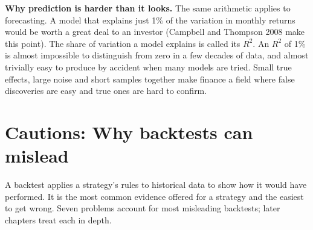
\textbf{Why prediction is harder than it looks.} The same arithmetic applies to forecasting. A model that explains just 1\% of the variation in monthly returns would be worth a great deal to an investor (Campbell and Thompson 2008 make this point). The share of variation a model explains is called its $R^2$. An $R^2$ of 1\% is almost impossible to distinguish from zero in a few decades of data, and almost trivially easy to produce by accident when many models are tried. Small true effects, large noise and short samples together make finance a field where false discoveries are easy and true ones are hard to confirm.

\section{Cautions: Why backtests can mislead}
\label{sec:01-backtests}

A backtest applies a strategy's rules to historical data to show how it would have performed. It is the most common evidence offered for a strategy and the easiest to get wrong. Seven problems account for most misleading backtests; later chapters treat each in depth.

